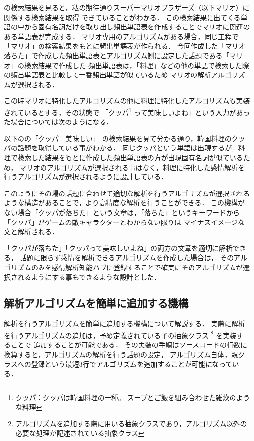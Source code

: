 の検索結果を見ると，私の期待通りスーパーマリオブラザーズ（以下マリオ）に関係する検索結果を取得
できていることがわかる．
この検索結果に出てくる単語の中から固有名詞だけを取り出し頻出単語表を作成することでマリオに関連のある単語表が完成する．
マリオ専用のアルゴリズムがある場合，同じ工程で「マリオ」の検索結果をもとに頻出単語表が作られる．
今回作成した「マリオ　落ちた」で作成した頻出単語表とアルゴリズム側に設定した話題である「マリオ」の検索結果で作成した
頻出単語表は，「料理」などの他の単語で検索した際の頻出単語表と比較して一番頻出単語が似ているため
マリオの解析アルゴリズムが選択される．

この時マリオに特化したアルゴリズムの他に料理に特化したアルゴリズムも実装されているとする，その状態で
「クッパ\footnote{クッパ：クッパは韓国料理の一種。 スープとご飯を組み合わせた雑炊のような料理}
って美味しいよね」という入力があった場合については次のようになる．

以下のの「クッパ　美味しい」
の検索結果を見て分かる通り，韓国料理のクッパの話題を取得している事がわかる．
同じクッパという単語は出現するが，料理で検索した結果をもとに作成した頻出単語表の方が出現固有名詞が似ているため，
マリオのアルゴリズムが選択される事はなく，料理に特化した感情解析を行うアルゴリズムが選択されるように設計している．


このようにその場の話題に合わせて適切な解析を行うアルゴリズムが選択されるような構造があることで，より高精度な解析を行うことができる．
この機構がない場合「クッパが落ちた」という文章は，「落ちた」というキーワードから「クッパ」がゲームの敵キャラクターとわからない限りは
マイナスイメージな文と解析される．

「クッパが落ちた」「クッパって美味しいよね」の両方の文章を適切に解析できる，
話題に限らず感情を解析できるアルゴリズムを作成した場合は，
そのアルゴリズムのみを感情解析知能ハブに登録することで確実にそのアルゴリズムが選択されるようにする事もできるような設計とした．

\subsection{解析アルゴリズムを簡単に追加する機構}
解析を行うアルゴリズムを簡単に追加する機構について解説する．
実際に解析を行うアルゴリズムの追加は，予め定義されている子の抽象クラス
\footnote{アルゴリズムを追加する際に用いる抽象クラスであり，アルゴリズム以外の必要な処理が記述されている抽象クラス}
を実装することで
追加することが可能である．
その実装の手順はソースコードの行数に換算すると，アルゴリズムの解析を行う話題の設定，
アルゴリズム自体，親クラスへの登録という最短3行でアルゴリズムを追加することが可能になっている．

